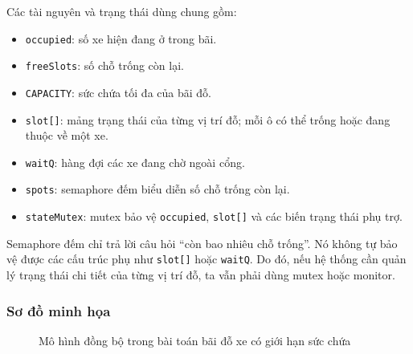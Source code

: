 Các tài nguyên và trạng thái dùng chung gồm:

\begin{itemize}
    \item \texttt{occupied}: số xe hiện đang ở trong bãi.
    \item \texttt{freeSlots}: số chỗ trống còn lại.
    \item \texttt{CAPACITY}: sức chứa tối đa của bãi đỗ.
    \item \texttt{slot[]}: mảng trạng thái của từng vị trí đỗ; mỗi ô có thể trống hoặc đang thuộc về một xe.
    \item \texttt{waitQ}: hàng đợi các xe đang chờ ngoài cổng.
    \item \texttt{spots}: semaphore đếm biểu diễn số chỗ trống còn lại.
    \item \texttt{stateMutex}: mutex bảo vệ \texttt{occupied}, \texttt{slot[]} và các biến trạng thái phụ trợ.
\end{itemize}

Semaphore đếm chỉ trả lời câu hỏi ``còn bao nhiêu chỗ trống''. Nó không tự
bảo vệ được các cấu trúc phụ như \texttt{slot[]} hoặc \texttt{waitQ}. Do đó,
nếu hệ thống cần quản lý trạng thái chi tiết của từng vị trí đỗ, ta vẫn
phải dùng mutex hoặc monitor.

\subsubsection*{Sơ đồ minh họa}

\begin{figure}[H]
\centering
{}
\caption{Mô hình đồng bộ trong bài toán bãi đỗ xe có giới hạn sức chứa}
\label{fig:parking-lot-template-model}
\end{figure}

